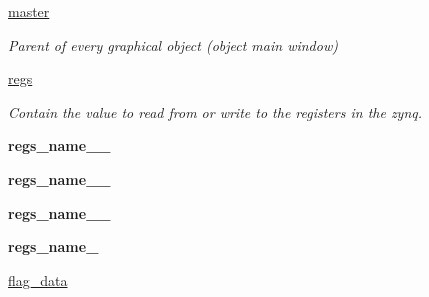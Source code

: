 \begin{DoxyCompactItemize}
\item 
\mbox{\label{classwatchman_1_1_watchman__main__window_a7db5be5bd31dd142b2ccfac4e45e1c02}} 
\mbox{\hyperlink{classwatchman_1_1_watchman__main__window_a7db5be5bd31dd142b2ccfac4e45e1c02}{master}}
\begin{DoxyCompactList}\small\item\em Parent of every graphical object (object main window) \end{DoxyCompactList}\item 
\mbox{\label{classwatchman_1_1_watchman__main__window_ad8d9b012eef926fac72654d3f5f09cca}} 
\mbox{\hyperlink{classwatchman_1_1_watchman__main__window_ad8d9b012eef926fac72654d3f5f09cca}{regs}}
\begin{DoxyCompactList}\small\item\em Contain the value to read from or write to the registers in the zynq. \end{DoxyCompactList}\item 
\mbox{\label{classwatchman_1_1_watchman__main__window_a52d0d7d6fb44d07e9f87b1b631ef1f10}} 
{\bfseries regs\+\_\+name\+\_\+\_}
\item 
\mbox{\label{classwatchman_1_1_watchman__main__window_a96d18237f0a4a7873fe7e73064322bf8}} 
{\bfseries regs\+\_\+name\+\_\+\_}
\item 
\mbox{\label{classwatchman_1_1_watchman__main__window_a8e13043a85b58da41d0c25c1870c677b}} 
{\bfseries regs\+\_\+name\+\_\+\_}
\item 
\mbox{\label{classwatchman_1_1_watchman__main__window_aa614929875f711d9ba1ec49e94560083}} 
{\bfseries regs\+\_\+name\+\_}
\item 
\mbox{\label{classwatchman_1_1_watchman__main__window_a32abbe4563a532b7a97cc288ce713612}} 
\mbox{\hyperlink{classwatchman_1_1_watchman__main__window_a32abbe4563a532b7a97cc288ce713612}{flag\+\_\+data}}

\end{DoxyCompactItemize}
